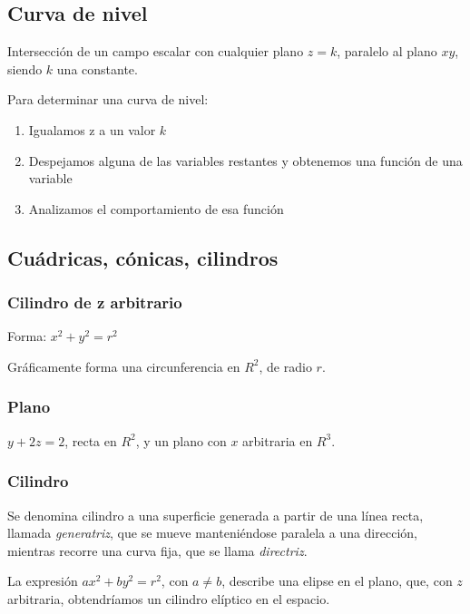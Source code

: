 \subsection{Curva de nivel}

Intersección de un campo escalar con cualquier plano \(z = k\), paralelo al
plano \(xy\), siendo \(k\) una constante.

Para determinar una curva de nivel:
\begin{enumerate}
    \item Igualamos z a un valor \(k\)
    \item Despejamos alguna de las variables restantes y obtenemos una función
          de una variable
    \item Analizamos el comportamiento de esa función
\end{enumerate}

\subsection{Cuádricas, cónicas, cilindros}

\subsubsection{Cilindro de z arbitrario}

Forma: \(x^{2} + y^{2} = r^{2}\)

Gráficamente forma una circunferencia en \(R^{2}\),
de radio \(r\).

\subsubsection{Plano}

\(y + 2z = 2\), recta en \(R^{2}\),
y un plano con \(x\) arbitraria en \(R^{3}\).

\subsubsection{Cilindro}

Se denomina cilindro a una superficie generada a partir de una línea recta,
llamada \textit{generatriz},
que se mueve manteniéndose paralela a una dirección,
mientras recorre una curva fija, que se llama \textit{directriz}.

La expresión \(ax^{2} + by^{2} = r^{2}\),
con \(a \neq b\), describe una elipse en el plano,
que, con \(z\) arbitraria,
obtendríamos un cilindro elíptico en el espacio.

